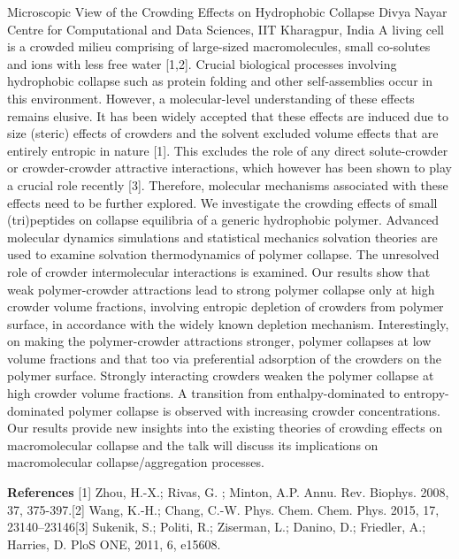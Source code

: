 
    \begin{abstract_online}{Microscopic View of the Crowding Effects on Hydrophobic Collapse}{%
        Divya Nayar}{%
        \IStag}{%
        Centre for Computational and Data Sciences, IIT Kharagpur, India}
    A living cell is a crowded milieu comprising of large-sized macromolecules, small co-solutes  and ions with less free water [1,2]. Crucial biological processes involving hydrophobic collapse  such as protein folding and other self-assemblies occur in this environment. However, a  molecular-level understanding of these effects remains elusive. It has been widely accepted that  these effects are induced due to size (steric) effects of crowders and the solvent excluded  volume effects that are entirely entropic in nature [1]. This excludes the role of any direct  solute-crowder or crowder-crowder attractive interactions, which however has been shown to  play a crucial role recently [3]. Therefore, molecular mechanisms associated with these effects  need to be further explored. We investigate the crowding effects of small (tri)peptides on  collapse equilibria of a generic hydrophobic polymer. Advanced molecular dynamics  simulations and statistical mechanics solvation theories are used to examine solvation  thermodynamics of polymer collapse. The unresolved role of crowder intermolecular  interactions is examined. Our results show that weak polymer-crowder attractions lead to strong  polymer collapse only at high crowder volume fractions, involving entropic depletion of  crowders from polymer surface, in accordance with the widely known depletion mechanism.  Interestingly, on making the polymer-crowder attractions stronger, polymer collapses at low  volume fractions and that too via preferential adsorption of the crowders on the polymer  surface. Strongly interacting crowders weaken the polymer collapse at high crowder volume  fractions. A transition from enthalpy-dominated to entropy-dominated polymer collapse is  observed with increasing crowder concentrations. Our results provide new insights into the  existing theories of crowding effects on macromolecular collapse and the talk will discuss its  implications on macromolecular collapse/aggregation processes.  
    
        \textbf{References} \newline{}[1] Zhou, H.-X.; Rivas, G. ; Minton, A.P. Annu. Rev. Biophys. 2008, 37, 375-397.\newline{}[2] Wang, K.-H.; Chang, C.-W. Phys. Chem. Chem. Phys. 2015, 17, 23140–23146\newline{}[3] Sukenik, S.; Politi, R.; Ziserman, L.; Danino, D.; Friedler, A.; Harries, D. PloS ONE, 2011, 6, e15608.
    \end{abstract_online}
    